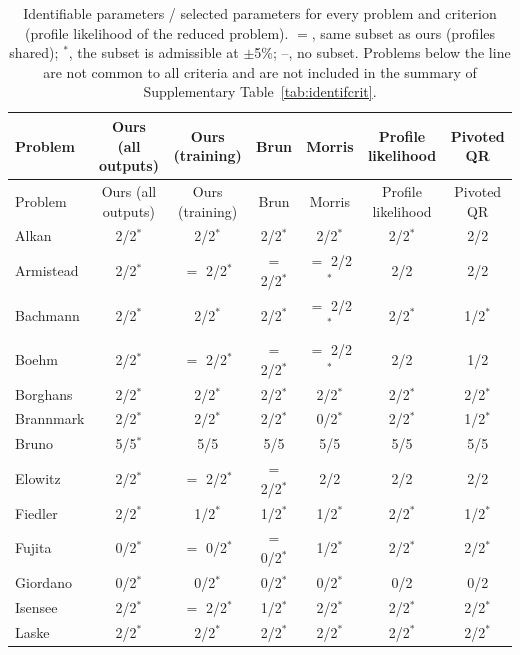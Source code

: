 \begin{longtable}{@{}lcccccc@{}}
\caption{Identifiable parameters / selected parameters for every problem and criterion (profile likelihood of the reduced problem). $=$, same subset as ours (profiles shared); $^{\ast}$, the subset is admissible at $\pm$5\%; --, no subset. Problems below the line are not common to all criteria and are not included in the summary of Supplementary Table~\ref{tab:identifcrit}.}\label{tab:identifcritprob}\\
\toprule
Problem & Ours (all outputs) & Ours (training) & Brun & Morris & Profile likelihood & Pivoted QR \\
\midrule
\endfirsthead
\toprule
Problem & Ours (all outputs) & Ours (training) & Brun & Morris & Profile likelihood & Pivoted QR \\
\midrule
\endhead
Alkan & 2/2$^{\ast}$ & 2/2$^{\ast}$ & 2/2$^{\ast}$ & 2/2$^{\ast}$ & 2/2$^{\ast}$ & 2/2 \\
Armistead & 2/2$^{\ast}$ & $=$ 2/2$^{\ast}$ & $=$ 2/2$^{\ast}$ & $=$ 2/2$^{\ast}$ & 2/2 & 2/2 \\
Bachmann & 2/2$^{\ast}$ & 2/2$^{\ast}$ & 2/2$^{\ast}$ & $=$ 2/2$^{\ast}$ & 2/2$^{\ast}$ & 1/2$^{\ast}$ \\
Boehm & 2/2$^{\ast}$ & $=$ 2/2$^{\ast}$ & $=$ 2/2$^{\ast}$ & $=$ 2/2$^{\ast}$ & 2/2 & 1/2 \\
Borghans & 2/2$^{\ast}$ & 2/2$^{\ast}$ & 2/2$^{\ast}$ & 2/2$^{\ast}$ & 2/2$^{\ast}$ & 2/2$^{\ast}$ \\
Brannmark & 2/2$^{\ast}$ & 2/2$^{\ast}$ & 2/2$^{\ast}$ & 0/2$^{\ast}$ & 2/2$^{\ast}$ & 1/2$^{\ast}$ \\
Bruno & 5/5$^{\ast}$ & 5/5 & 5/5 & 5/5 & 5/5 & 5/5 \\
Elowitz & 2/2$^{\ast}$ & $=$ 2/2$^{\ast}$ & $=$ 2/2$^{\ast}$ & 2/2 & 2/2 & 2/2 \\
Fiedler & 2/2$^{\ast}$ & 1/2$^{\ast}$ & 1/2$^{\ast}$ & 1/2$^{\ast}$ & 2/2$^{\ast}$ & 1/2$^{\ast}$ \\
Fujita & 0/2$^{\ast}$ & $=$ 0/2$^{\ast}$ & $=$ 0/2$^{\ast}$ & 1/2$^{\ast}$ & 2/2$^{\ast}$ & 2/2$^{\ast}$ \\
Giordano & 0/2$^{\ast}$ & 0/2$^{\ast}$ & 0/2$^{\ast}$ & 0/2$^{\ast}$ & 0/2 & 0/2 \\
Isensee & 2/2$^{\ast}$ & $=$ 2/2$^{\ast}$ & 1/2$^{\ast}$ & 2/2$^{\ast}$ & 2/2$^{\ast}$ & 2/2$^{\ast}$ \\
Laske & 2/2$^{\ast}$ & 2/2$^{\ast}$ & 2/2$^{\ast}$ & 2/2$^{\ast}$ & 2/2$^{\ast}$ & 2/2$^{\ast}$ \\

\end{longtable}
